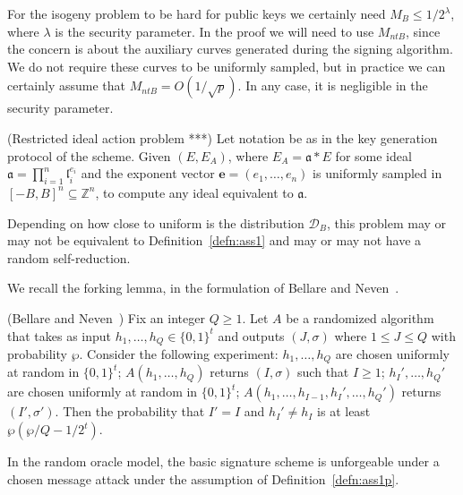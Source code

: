 \documentclass{llncs}
\newcommand{\D}{\mathcal{D}}
\newcommand{\Z}{\mathbb{Z}}
\renewcommand{\a}{\mathfrak{a}}
\renewcommand{\l}{\mathfrak{l}}
\newcommand{\e}{\textbf{e}}
\begin{document}
For the isogeny problem to be hard for public keys we certainly need $M_B \le 1/2^\lambda$, where $\lambda$ is the security parameter.
In the proof we will need to use $M_{ntB}$, since the concern is about the auxiliary curves generated during the signing algorithm. We do not require these curves to be uniformly sampled, but in practice we can certainly assume that $M_{ntB} = O( 1/\sqrt{p} )$. In any case, it is negligible in the security parameter.



\begin{definition} \label{defn:ass1p}
(Restricted ideal action problem ***)
Let notation be as in the key generation protocol of the scheme.
Given $(E, E_A)$, where $E_A = \a * E$ for some ideal $\a = \prod_{i=1}^n \l_i^{e_i}$ and the exponent vector $\e = (e_1, \dots, e_n)$ is uniformly sampled in $[-B,B]^n \subseteq \Z^n$, to compute any ideal equivalent to $\a$.
\end{definition}

Depending on how close to uniform is the distribution $\D_B$, this problem may or may not be equivalent to Definition~\ref{defn:ass1} and may or may not have a random self-reduction.


We recall the forking lemma, in the formulation of Bellare and Neven~\cite{BN06}.

\begin{lemma} \label{forking-lemma} (Bellare and Neven~\cite{BN06})
Fix an integer $Q \ge 1$. Let $A$ be a randomized algorithm that takes as input $h_1, \dots, h_Q \in \{0,1\}^t$ and outputs $(J, \sigma)$ where $ 1\le J \le Q$ with probability $\wp$.
Consider the following experiment: $h_1, \dots, h_Q$ are chosen uniformly at random in $\{0,1\}^t$; $A(h_1, \dots, h_Q )$ returns $(I,\sigma)$ such that $I \ge 1$; $h_I', \dots, h_Q'$ are chosen uniformly at random in $\{0,1\}^t$; $A( h_1, \dots, h_{I-1}, h_I', \dots, h_Q' )$ returns $(I', \sigma')$.
Then the probability that $I' = I$ and $h_{I}' \ne h_I$ is at least $\wp( \wp/Q - 1/2^t )$.
\end{lemma}


\begin{theorem}\label{thm:security-basic}
In the random oracle model, the basic signature scheme is unforgeable under a chosen message attack under the assumption of Definition~\ref{defn:ass1p}.
\end{theorem}
\end{document}
